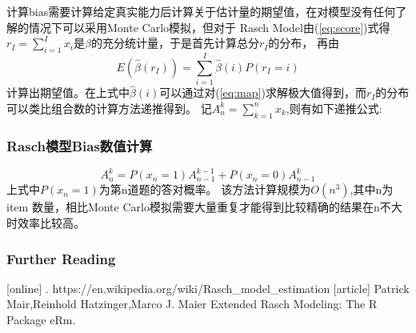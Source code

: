 \documentclass[xetex,mathserif,serif]{beamer}
\begin{document}
   \begin{frame}\label{A5}
    计算bias需要计算给定真实能力后计算关于估计量的期望值，在对模型没有任何了解的情况下可以采用Monte Carlo模拟，但对于
Rasch Model由(\ref{eq:score})式得$r_I=\displaystyle\sum_{i=1}^I x_i$是$\beta$的充分统计量，于是首先计算总分$r_I$的分布，
再由
\begin{equation}
E(\hat{\beta}(r_I))=\sum_{i=1}^I \hat{\beta}(i)P(r_I=i)
\end{equation}
计算出期望值。在上式中$\hat{\beta}(i)$可以通过对(\ref{eq:map})求解极大值得到，而$r_I$的分布可以类比组合数的计算方法递推得到。
记$A_n^k=\displaystyle\sum_{k=1}^n x_k$,则有如下递推公式:
    \frametitle{Rasch模型Bias数值计算}
  \end{frame}
   \begin{frame}
\begin{equation}
A_n^k=P(x_n=1)A_{n-1}^{k-1}+P(x_n=0)A_{n-1}^k
\end{equation}
上式中$P(x_n=1)$为第n道题的答对概率。
该方法计算规模为$O(n^3)$,其中n为item 数量，相比Monte Carlo模拟需要大量重复才能得到比较精确的结果在n不大时效率比较高。
\end{frame}
   \begin{frame}[allowframebreaks]
  \frametitle<presentation>{Further Reading}    
  \begin{thebibliography}{10}    
  [online]
    .
    \newblock https://en.wikipedia.org/wiki/Rasch\_model\_estimation
   [article]
   Patrick Mair,Reinhold Hatzinger,Marco J. Maier
    \newblock Extended Rasch Modeling: The R Package eRm.
  \end{thebibliography}
\end{frame}
\end{document}
